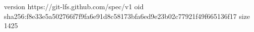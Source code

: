 version https://git-lfs.github.com/spec/v1
oid sha256:f8e33e5a502766f7f9fa6e91d8c58173bfa6ed9e23b02c77921f49f665136f17
size 1425
